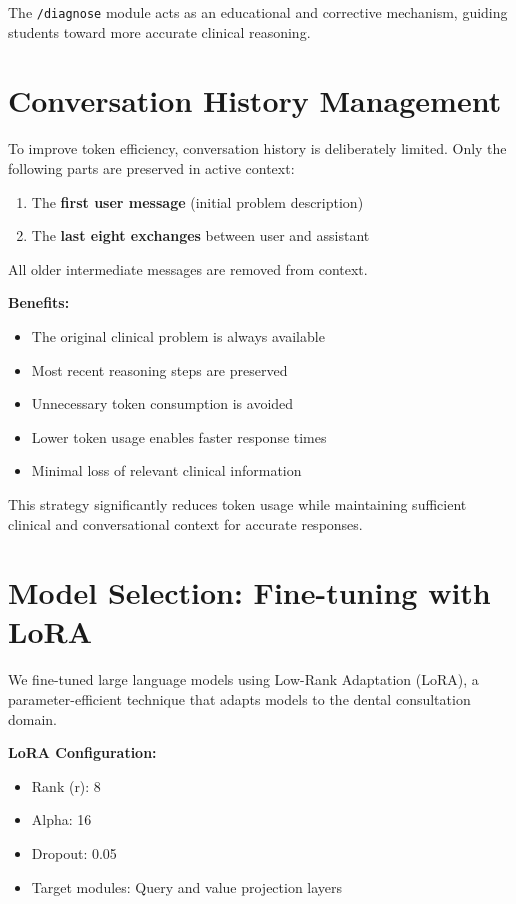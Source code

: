 \documentclass[runningheads,a4paper,11pt]{report}
\begin{document}
The \texttt{/diagnose} module acts as an educational and corrective mechanism, guiding students toward more accurate clinical reasoning.

\section{Conversation History Management}
\label{section:historyManagement}

To improve token efficiency, conversation history is deliberately limited. Only the following parts are preserved in active context:

\begin{enumerate}
\item The \textbf{first user message} (initial problem description)
\item The \textbf{last eight exchanges} between user and assistant
\end{enumerate}

All older intermediate messages are removed from context.

\textbf{Benefits:}
\begin{itemize}
\item The original clinical problem is always available
\item Most recent reasoning steps are preserved
\item Unnecessary token consumption is avoided
\item Lower token usage enables faster response times
\item Minimal loss of relevant clinical information
\end{itemize}

This strategy significantly reduces token usage while maintaining sufficient clinical and conversational context for accurate responses.

\section{Model Selection: Fine-tuning with LoRA}

We fine-tuned large language models using Low-Rank Adaptation (LoRA), a parameter-efficient technique that adapts models to the dental consultation domain.

\textbf{LoRA Configuration:}
\begin{itemize}
\item Rank (r): 8
\item Alpha: 16
\item Dropout: 0.05
\item Target modules: Query and value projection layers
\end{itemize}
\end{document}
